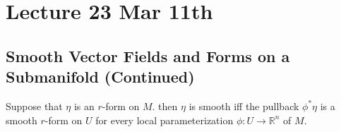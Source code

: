 \documentclass[notoc,notitlepage]{tufte-book}
\begin{document}

\chapter{Lecture 23 Mar 11th}%
\label{chp:lecture_23_mar_11th}

\section{Smooth Vector Fields and Forms on a Submanifold (Continued)}%
\label{sec:smooth_vector_fields_and_forms_on_a_submanifold_continued}

\begin{lemma}\label{lemma:smoothness_of_pullbacks_and_forms}
  Suppose that $\eta$ is an $r$-form on $M$. then $\eta$ is smooth iff the
  pullback $\phi^* \eta$ is a smooth $r$-form on $U$ for every local
  parameterization $\phi : U \to \mathbb{R}^n$ of $M$.
\end{lemma}
\end{document}
